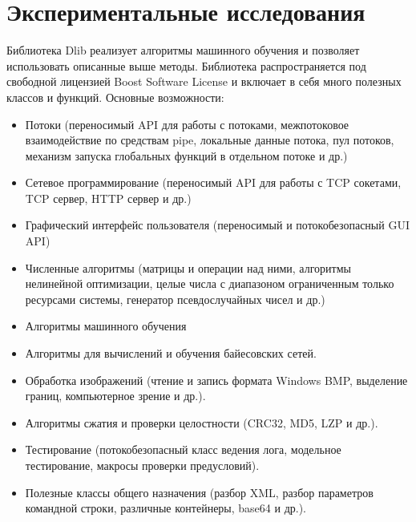 \documentclass[a4paper, 14pt]{extarticle}	%
\begin{document}

\tableofcontents














\newpage
\section{Экспериментальные исследования}

Библиотека Dlib реализует алгоритмы машинного обучения и позволяет использовать описанные выше методы. Библиотека распространяется под свободной лицензией  Boost Software License и включает в себя много полезных классов и функций. Основные возможности:
\begin{itemize}
\item Потоки (переносимый API для работы с потоками, межпотоковое взаимодействие по средствам pipe, локальные данные потока, пул потоков, механизм запуска глобальных функций в отдельном потоке и др.)
\item Сетевое программирование (переносимый API для работы с TCP сокетами, TCP сервер, HTTP сервер и др.)
\item Графический интерфейс пользователя (переносимый и потокобезопасный GUI API)
\item Численные алгоритмы (матрицы и операции над ними, алгоритмы нелинейной оптимизации, целые числа с диапазоном ограниченным только ресурсами системы, генератор псевдослучайных чисел и др.)
\item Алгоритмы машинного обучения
\item Алгоритмы для вычислений и обучения байесовских сетей.
\item Обработка изображений (чтение и запись формата Windows BMP, выделение границ, компьютерное зрение и др.).
\item Алгоритмы сжатия и проверки целостности (CRC32, MD5, LZP и др.).
\item Тестирование (потокобезопасный класс ведения лога, модельное тестирование, макросы проверки предусловий).
\item Полезные классы общего назначения (разбор XML, разбор параметров командной строки, различные контейнеры, base64 и др.). 
\end{itemize}
\end{document}
